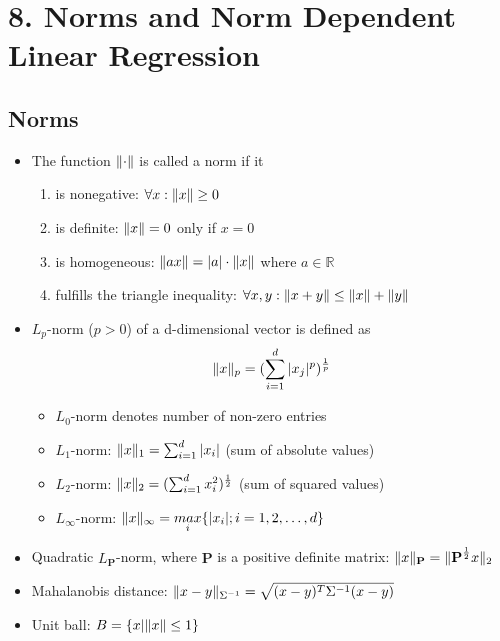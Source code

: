 \section*{8. Norms and Norm Dependent Linear Regression}
\subsection*{Norms}
\begin{itemize}
    \item
        The function $\lVert\cdot\rVert$ is called a norm if it
        \begin{enumerate}
            \item
                is nonegative: $\forall x: \lVert x\rVert \geq{0}$
            \item
                is definite: $\lVert x\rVert = 0$ only if $x = 0$
            \item
                is homogeneous: $\lVert ax\rVert = |a| \cdot \lVert x\rVert$ where $a \in \mathbb{R}$
            \item
                fulfills the triangle inequality: $\forall x,y: \lVert x+y\rVert \leq \lVert x\rVert + \lVert y\rVert$
        \end{enumerate}
    \item
        $L_p$-norm ($p>0$) of a d-dimensional vector is defined as $$\lVert x\rVert_p = (\sum_{i=1}^{d} |x_j|^p)^{\frac{1}{p}}$$
        \begin{itemize}
            \item
                $L_0$-norm denotes number of non-zero entries
            \item
                $L_1$-norm: $\lVert x\rVert_1 = \sum_{i=1}^d |x_i|$ (sum of absolute values)
            \item
                $L_2$-norm: $\lVert x\rVert_2 = (\sum_{i=1}^d x_i^2)^{\frac{1}{2}}$ (sum of squared values)
            \item
                $L_{\infty}$-norm: $\lVert x\rVert_{\infty} = \underset{i}{max}\{|x_i|; i=1,2,\dots,d\}$
        \end{itemize}
    \item
        Quadratic $L_{\textbf{P}}$-norm, where $\textbf{P}$ is a positive definite matrix: $\lVert x\rVert_{\textbf{P}} = \lVert\textbf{P}^{\frac{1}{2}}x\rVert_2$
    \item
        Mahalanobis distance: $\lVert x-y\rVert_{\Sigma^{-1}} = \sqrt{(x-y)^T \Sigma^{-1} (x-y)}$
    \item
        Unit ball: $B = \{x | \lVert x\rVert \leq 1\}$
    \end{itemize}


